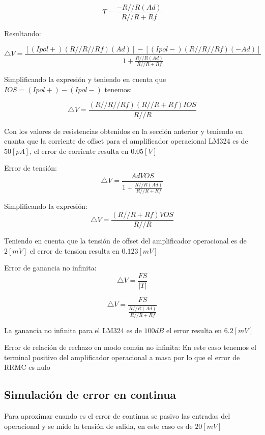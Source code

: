 \documentclass[12pt]{article}
\begin{document}
	
	\begin{equation}
		T=\frac{-R//R(Ad)}{R//R+Rf}
	\end{equation}
	
	Resultando:
	
	\begin{equation}
		\bigtriangleup V = \frac{[(Ipol+)(R//R//Rf)(Ad)]-[(Ipol-)(R//R//Rf)(-Ad)]}{1+ \frac{R//R(Ad)}{R//R+Rf}}
	\end{equation}
	
	Simplificando la expresión y teniendo en cuenta que $IOS=(Ipol+)-(Ipol-)$ tenemos:
	
	\begin{equation}
		\bigtriangleup V = \frac{(R//R//Rf)(R//R+Rf)IOS}{R//R}
	\end{equation}
	
	Con los valores de resistencias obtenidos en la sección anterior y teniendo en cuanta que la corriente de offset para el amplificador operacional LM324 es de $ 50[pA]$, el error de corriente resulta en $0.05[V]$
	
	Error de tensión:
	\begin{equation}
		\bigtriangleup V = \frac{Ad VOS}{1+\frac{R//R(Ad)}{R//R+Rf}}
	\end{equation}
	
	Simplificando la expresión:
	\begin{equation}
		\bigtriangleup V = \frac{(R//R+Rf)VOS}{R//R}
	\end{equation}
	
	Teniendo en cuenta que la tensión de offset del amplificador operacional es de $2[mV]$ el error de tension resulta en $0.123[mV]$
	
	Error de ganancia no infinita:
	\begin{equation}
		\bigtriangleup V = \frac{FS}{|T|}
	\end{equation}
	
	\begin{equation}
		\bigtriangleup V = \frac{FS}{\frac{R//R(Ad)}{R//R+Rf}}
	\end{equation}
	
	La ganancia no infinita para el LM324 es de $100dB$ el error resulta en $6.2[mV]$
	
	Error de relación de rechazo en modo común no infinita:
	En este caso tenemos el terminal positivo del amplificador operacional a masa por lo que el error de RRMC es nulo
	
	\subsection{Simulación de error en continua}
	Para aproximar cuando es el error de continua se pasivo las entradas del operacional y se mide la tensión de salida, en este caso es de $20[mV]$
	
\end{document}
